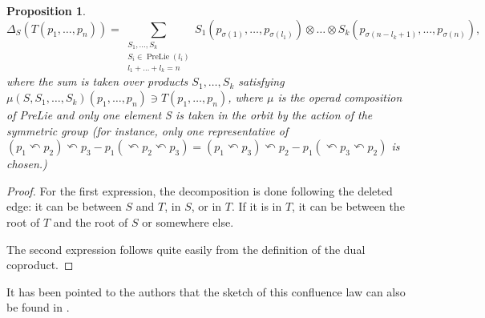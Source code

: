 \documentclass[11pt,leqno]{amsart}
\theoremstyle{definition}
\theoremstyle{plain}
\newtheorem{proposition}[definition]{Proposition}
\begin{document}
\begin{proposition}
\begin{equation*}
\Delta_S(T(p_1, \ldots, p_n))=\sum_{\substack{S_1, \ldots, S_k \\ S_i \in \operatorname{PreLie}(l_i)\\ l_1 + \ldots + l_k = n}} S_1(p_{\sigma(1)}, \ldots, p_{\sigma(l_1)}) \otimes \ldots \otimes S_k(p_{\sigma(n-l_k+1)}, \ldots, p_{\sigma(n)}),
\end{equation*}
where the sum is taken over products $S_1, \ldots, S_k$ satisfying $\mu(S,S_1, \ldots, S_k) (p_1, \ldots, p_n) \ni T(p_1, \ldots, p_n)$, where $\mu$ is the operad composition of PreLie and only one element S is taken in the orbit by the action of the symmetric group (for instance, only one representative of $(p_1 \curvearrowleft p_2) \curvearrowleft p_3 - p_1 (\curvearrowleft p_2 \curvearrowleft p_3 )= (p_1 \curvearrowleft p_3) \curvearrowleft p_2 - p_1 (\curvearrowleft p_3 \curvearrowleft p_2 ) $ is chosen.)


\end{proposition}

\begin{proof}
For the first expression, the decomposition is done following the deleted edge: it can be between $S$ and $T$, in $S$, or in $T$. If it is in $T$, it can be between the root of $T$ and the root of $S$ or somewhere else.

The second expression follows quite easily from the definition of the dual coproduct. 
\end{proof}

It has been pointed to the authors that the sketch of this confluence law can also be found in  \cite{LMB}.
\end{document}
